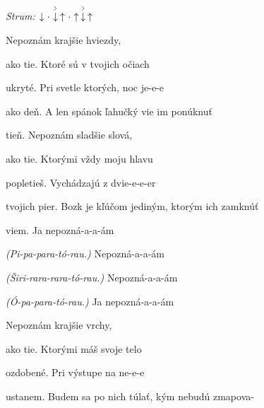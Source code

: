 \begin{song}


\begin{headerbox}
\RaiseBoxWithAccents
\textit{Strum:} $\Down\Miss\AccentDown\Up\Miss\Up\AccentDown\Up$
\end{headerbox}

\begin{hchordbox}
\end{hchordbox}

\large

\bigskip

 Nepoznám krajšie hviezdy,  \par
ako tie. Ktoré sú v tvojich očiach  \par
ukryté. Pri svetle ktorých, noc je-e-e  \par
ako deň. A len spánok ľahučký vie im ponúknuť \par

\bigskip

tieň. Nepoznám sladšie slová,  \par
ako tie. Ktorými vždy moju hlavu  \par
popletieš. Vychádzajú z dvie-e-e-er  \par
tvojich pier. Bozk je kľúčom jediným, ktorým ich zamknúť \par

\bigskip

\begin{chorusboxwide}{\Refren}
viem. Ja nepozná-a-a-ám \par
\textit{(Pi-pa-para-}\textit{tó-rau.)} Nepozná-a-a-ám \par
\textit{(Širi-rara-rara-}\textit{tó-rau.)} Nepozná-a-a-ám \par
\textit{(Ó-pa-para-}\textit{tó-rau.)} Ja nepozná-a-a-ám \par
\end{chorusboxwide}

\bigskip

 Nepoznám krajšie vrchy, \par
ako tie. Ktorými máš svoje telo  \par
ozdobené. Pri výstupe na ne-e-e  \par
ustanem. Budem sa po nich túlať, kým nebudú zmapova- \par


\end{song}
